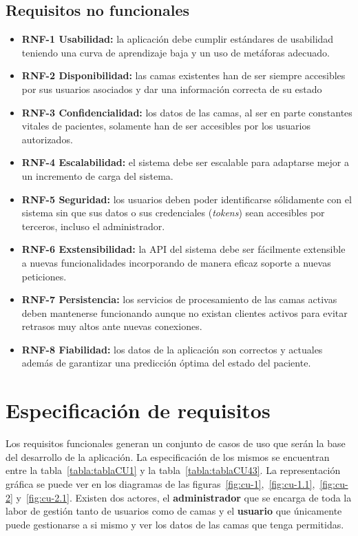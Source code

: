 \subsection{Requisitos no funcionales}\label{requisitos-no-funcionales}
\begin{itemize}
\tightlist
\item
\textbf{RNF-1 Usabilidad:} la aplicación debe cumplir estándares de usabilidad teniendo una curva de aprendizaje baja y un uso de metáforas adecuado.
\item 
\textbf{RNF-2 Disponibilidad:} las camas existentes han de ser siempre accesibles por sus usuarios asociados y dar una información correcta de su estado
\item 
\textbf{RNF-3 Confidencialidad:} los datos de las camas, al ser en parte constantes vitales de pacientes, solamente han de ser accesibles por los usuarios autorizados.
\item
\textbf{RNF-4 Escalabilidad:} el sistema debe ser escalable para adaptarse mejor a un incremento de carga del sistema.
\item 
\textbf{RNF-5 Seguridad:} los usuarios deben poder identificarse sólidamente con el sistema sin que sus datos o sus credenciales (\textit{tokens}) sean accesibles por terceros, incluso el administrador.
\item
\textbf{RNF-6 Exstensibilidad:} la API del sistema debe ser fácilmente extensible a nuevas funcionalidades incorporando de manera eficaz soporte a nuevas peticiones.
\item
\textbf{RNF-7 Persistencia:} los servicios de procesamiento de las camas activas deben mantenerse funcionando aunque no existan clientes activos para evitar retrasos muy altos ante nuevas conexiones.
\item
\textbf{RNF-8 Fiabilidad:} los datos de la aplicación son correctos y actuales además de garantizar una predicción óptima del estado del paciente.
\end{itemize}

\section{Especificación de requisitos}\label{casos-uso}

Los requisitos funcionales generan un conjunto de casos de uso que serán la base del desarrollo de la aplicación. La especificación de los mismos se encuentran entre la tabla~\ref{tabla:tablaCU1} y la tabla~\ref{tabla:tablaCU43}. La representación gráfica se puede ver en los diagramas de las figuras~\ref{fig:cu-1},~\ref{fig:cu-1.1},~\ref{fig:cu-2} y~\ref{fig:cu-2.1}. Existen dos actores, el \textbf{administrador} que se encarga de toda la labor de gestión tanto de usuarios como de camas y el \textbf{usuario} que únicamente puede gestionarse a si mismo y ver los datos de las camas que tenga permitidas.

